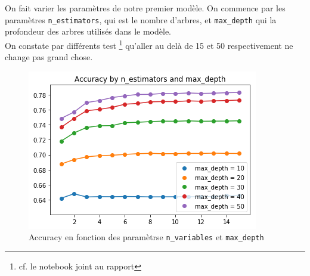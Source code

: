 \documentclass[12pt,a4paper]{article}
\numberwithin{equation}{section}
\begin{document}
	On fait varier les paramètres de notre premier modèle. On commence par les paramètres \texttt{n\_estimators}, qui est le nombre d'arbres, et \texttt{max\_depth} qui la profondeur des arbres utilisés dans le modèle.\\ On constate par différents test \footnote{cf. le notebook joint au rapport} qu'aller au delà de 15 et 50 respectivement ne change pas grand chose.
	
	
	
	\begin{figure}[h]
		\centering
		\includegraphics[width=0.7\linewidth]{img/random_forest_accuracy}
		\caption{Accuracy en fonction des paramètrse \texttt{n\_variables}  et \texttt{max\_depth}}
		\label{fig:randomforestaccuracy1}
	\end{figure}
	
	
	
	
	
	
	
\end{document}
